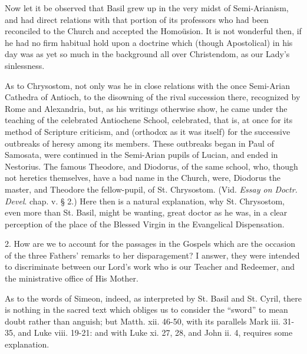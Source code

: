 Now let it be observed that Basil grew up in the very midst of
Semi-Arianism, and had direct relations with that portion of its
professors who had been reconciled to the Church and accepted the
Homoüsion. It is not wonderful then, if he had no firm habitual hold
upon a doctrine which (though Apostolical) in his day was as yet so much
in the background all over Christendom, as our Lady's sinlessness.


As to Chrysostom, not only was he in close relations with the once
Semi-Arian Cathedra of Antioch, to the disowning of the rival succession
there, recognized by Rome and Alexandria, but, as his writings otherwise
show, he came under the teaching of the celebrated Antiochene School,
celebrated, that is, at once for its method of Scripture criticism, and
(orthodox as it was itself) for the successive outbreaks of heresy among
its members. These outbreaks began in Paul of Samosata, were continued
in the Semi-Arian pupils of Lucian, and ended in Nestorius. The
famous Theodore, and Diodorus, of the same school, who, though not
heretics themselves, have a bad name in the Church, were, Diodorus the
master, and Theodore the fellow-pupil, of St. Chrysostom. (Vid. \emph{Essay
on Doctr. Devel}. chap. v. § 2.) Here then is a natural explanation,
why St. Chrysostom, even more than St. Basil, might be wanting, great
doctor as he was, in a clear perception of the place of the Blessed
Virgin in the Evangelical Dispensation.


2. How are we to account for the passages in the Gospels which are
the occasion of the three Fathers' remarks to her disparagement? I
answer, they were intended to discriminate between our Lord's work who
is our Teacher and Redeemer, and the ministrative office of His Mother.


As to the words of Simeon, indeed, as interpreted by St. Basil and
St. Cyril, there is nothing in the sacred text which obliges us to
consider the ``sword'' to mean doubt rather than anguish; but
Matth. xii. 46-50, with its parallels Mark iii. 31-35, and Luke viii.
19-21: and with Luke xi. 27, 28, and John ii. 4, requires some
explanation.


